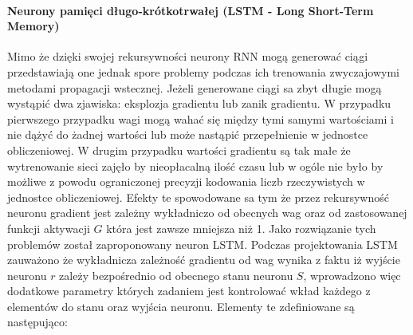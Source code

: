 \paragraph{Neurony pamięci długo-krótkotrwałej (LSTM - Long Short-Term Memory)}
Mimo że dzięki swojej rekursywności neurony RNN mogą generować ciągi przedstawiają one jednak spore problemy podczas ich trenowania zwyczajowymi metodami propagacji wstecznej. Jeżeli generowane ciągi sa zbyt długie mogą wystąpić dwa zjawiska: eksplozja gradientu lub zanik gradientu. W przypadku pierwszego przypadku wagi mogą wahać się między tymi samymi wartościami i nie dążyć do żadnej wartości lub może nastąpić przepełnienie w jednostce obliczeniowej. W drugim przypadku wartości gradientu są tak małe że wytrenowanie sieci zajęło by nieopłacalną ilość czasu lub w ogóle nie było by możliwe z powodu ograniczonej precyzji kodowania liczb rzeczywistych w jednostce obliczeniowej. Efekty te spowodowane sa tym że przez rekursywność neuronu gradient jest zależny wykładniczo od obecnych wag oraz od zastosowanej funkcji aktywacji $G$ która jest zawsze mniejsza niż 1.\cite[p.~18]{LSTM-intro}
Jako rozwiązanie tych problemów został zaproponowany neuron LSTM. Podczas projektowania LSTM zauważono że wykładnicza zależność gradientu od wag wynika z faktu iż wyjście neuronu $r$ zależy bezpośrednio od obecnego stanu neuronu $S$, wprowadzono więc dodatkowe parametry których zadaniem jest kontrolować wkład każdego z elementów do stanu oraz wyjścia neuronu.\cite[p.~22,23]{LSTM-intro} Elementy te zdefiniowane są następująco:
